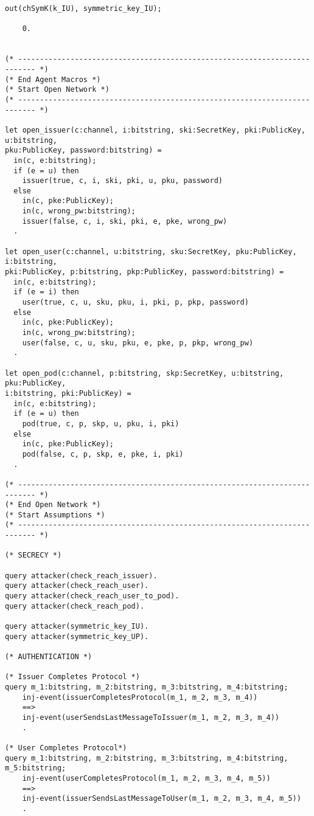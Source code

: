 \begin{Verbatim}[fontsize=\small]
    out(chSymK(k_IU), symmetric_key_IU);

    0.


(* -------------------------------------------------------------------------- *)
(* End Agent Macros *)
(* Start Open Network *)
(* -------------------------------------------------------------------------- *)

let open_issuer(c:channel, i:bitstring, ski:SecretKey, pki:PublicKey, u:bitstring, 
pku:PublicKey, password:bitstring) =
  in(c, e:bitstring);
  if (e = u) then
    issuer(true, c, i, ski, pki, u, pku, password)
  else
    in(c, pke:PublicKey);
    in(c, wrong_pw:bitstring);
    issuer(false, c, i, ski, pki, e, pke, wrong_pw)
  .

let open_user(c:channel, u:bitstring, sku:SecretKey, pku:PublicKey, i:bitstring, 
pki:PublicKey, p:bitstring, pkp:PublicKey, password:bitstring) =
  in(c, e:bitstring);
  if (e = i) then
    user(true, c, u, sku, pku, i, pki, p, pkp, password)
  else
    in(c, pke:PublicKey);
    in(c, wrong_pw:bitstring);
    user(false, c, u, sku, pku, e, pke, p, pkp, wrong_pw)
  .

let open_pod(c:channel, p:bitstring, skp:SecretKey, u:bitstring, pku:PublicKey, 
i:bitstring, pki:PublicKey) =
  in(c, e:bitstring);
  if (e = u) then
    pod(true, c, p, skp, u, pku, i, pki)
  else
    in(c, pke:PublicKey);
    pod(false, c, p, skp, e, pke, i, pki)
  .

(* -------------------------------------------------------------------------- *)
(* End Open Network *)
(* Start Assumptions *)
(* -------------------------------------------------------------------------- *)

(* SECRECY *)

query attacker(check_reach_issuer).
query attacker(check_reach_user).
query attacker(check_reach_user_to_pod).
query attacker(check_reach_pod).
 
query attacker(symmetric_key_IU).
query attacker(symmetric_key_UP).

(* AUTHENTICATION *)

(* Issuer Completes Protocol *)
query m_1:bitstring, m_2:bitstring, m_3:bitstring, m_4:bitstring; 
    inj-event(issuerCompletesProtocol(m_1, m_2, m_3, m_4))
    ==>
    inj-event(userSendsLastMessageToIssuer(m_1, m_2, m_3, m_4))
    .

(* User Completes Protocol*)
query m_1:bitstring, m_2:bitstring, m_3:bitstring, m_4:bitstring, m_5:bitstring; 
    inj-event(userCompletesProtocol(m_1, m_2, m_3, m_4, m_5))
    ==>
    inj-event(issuerSendsLastMessageToUser(m_1, m_2, m_3, m_4, m_5))
    .


\end{Verbatim}
